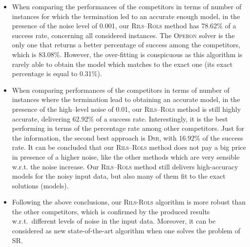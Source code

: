 \documentclass[a4paper,12pt]{elsarticle}
\begin{document}
\begin{itemize}
	\item  When comparing the performances of the competitors in terms of number of instances for which the  termination led to an accurate enough model, in the presence of the noise level of 0.001, our \textsc{Rils}--\textsc{Rols} method has 78.62\% of a success rate, concerning all considered instances.  The \textsc{Operon} solver is the only one that returns a better percentage of success among the competitors, which is 83.08\%. However, the over-fitting is conspicuous as this algorithm is rarely able to obtain the model which matches to the exact one (its exact percentage is equal to 0.31\%). 
	
	\item   When comparing performances of the competitors in terms of number of instances where the termination lead to obtaining an accurate model, in the presence of the high--level noise of 0.01, our \textsc{Rils}--\textsc{Rols} method is still highly accurate, delivering  62.92\% of a success rate. Interestingly, it is the best performing in terms of the percentage rate among other competitors. Just for  the information, the second best approach is \textsc{Dsr}, with 16.92\% of the success rate. It can be concluded that our \textsc{Rils}--\textsc{Rols} method does not pay a big price in presence of a higher noise, like the other methods which are very sensible w.r.t. the noise increase. Our \textsc{Rils}--\textsc{Rols} method still delivers high-accuracy models for the noisy input data, but also many of them fit to the exact solutions (models). 	  
	
	\item Following the above conclusions, our \textsc{Rils}-\textsc{Rols} algorithm is more robust than the other competitors, which is confirmed by the produced results w.r.t.\ different levels of noise in the input data. Moreover, it can be considered as new state-of-the-art algorithm when one solves the problem of SR. 
	
\end{itemize}
\end{document}

